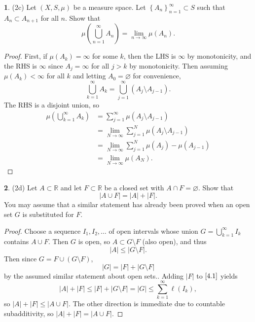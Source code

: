 \documentclass[12pt]{article}
\theoremstyle{definition}
\newtheorem{ex}{}
\begin{document}
\begin{ex}
	(2c)
	Let $(X, S, \mu)$ be a measure space.
	Let $\left\lbrace A_n \right\rbrace_{n=1}^\infty \subset S$ such that $A_n \subset A_{n+1}$ for all $n$.
	Show that \begin{equation*}
		\mu \left( \bigcup_{n=1}^\infty A_n \right) = \lim_{n\to\infty} \mu(A_n).
	\end{equation*}
\end{ex}
\begin{proof}
	First, if $\mu(A_k) = \infty$ for some $k$, then the LHS is $\infty$ by monotonicity, and the RHS is $\infty$ since $A_{j} = \infty$ for all $j > k$ by monotonicity.
	Then assuming $\mu(A_k) < \infty$ for all $k$ and letting $A_0 = \varnothing$ for convenience, \begin{equation*}
		\bigcup_{k = 1}^\infty A_k = \bigcup_{j=1}^\infty(A_j \setminus A_{j-1}).
	\end{equation*}
	The RHS is a disjoint union, so \begin{align*}
		\mu \left( \bigcup_{k=1}^\infty A_k \right) & = \sum_{j=1}^\infty \mu(A_j \setminus A_{j-1})                \\
		                                            & = \lim_{N \to \infty} \sum_{j=1}^N \mu(A_j \setminus A_{j-1}) \\
		                                            & = \lim_{N \to \infty} \sum_{j=1}^N \mu(A_j) - \mu(A_{j-1})    \\
		                                            & = \lim_{N \to \infty} \mu(A_N).
	\end{align*}
\end{proof}

\begin{ex}
	(2d)
	Let $A \subset \mathbb{R}$ and let $F \subset \mathbb{R}$ be a closed set with $A \cap F = \varnothing$.
	Show that \begin{equation*}
		|A \cup F| = |A| + |F|.
	\end{equation*}
	You may assume that a similar statement has already been proved when an open set $G$ is substituted for $F$.
\end{ex}
\begin{proof}
	Choose a sequence $I_1, I_2, \dots$ of open intervals whose union $G = \bigcup_{k=1}^\infty I_k$ contains $A \cup F$.
	Then $G$ is open, so $A \subset G \setminus F$ (also open), and thus \begin{equation}\label{4.1}
		|A| \leq |G \setminus F|.
	\end{equation}
	Then since $G = F \cup (G \setminus F)$, \begin{equation*}
		|G| = |F| + |G \setminus F|
	\end{equation*}
	by the assumed similar statement about open sets..
	Adding $|F|$ to $\eqref{4.1}$ yields \begin{equation*}
		|A| + |F| \leq |F| + |G \setminus F| = |G| \leq \sum_{k=1}^\infty \ell(I_k),
	\end{equation*}
	so $|A| + |F| \leq |A \cup F|$.
	The other direction is immediate due to countable subadditivity, so $|A| + |F| = |A \cup F|$.
\end{proof}
\end{document}
